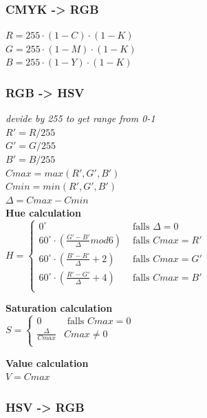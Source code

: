 \subsubsection{CMYK -> RGB}

$R = 255 \cdot (1-C) \cdot (1-K)$\\
$G = 255 \cdot (1-M) \cdot (1-K)$\\
$B = 255 \cdot (1-Y) \cdot (1-K)$\\

\subsubsection{RGB -> HSV}
\textit{devide by 255 to get range from 0-1}\\
$R' = R / 255$\\
$G' = G / 255$\\
$B' = B / 255$\\

$Cmax = max(R',G',B')$\\
$Cmin = min(R',G',B')$\\
$\Delta = Cmax - Cmin$\\

\textbf{Hue calculation}\\

$H = \begin{cases}
	0^\circ     & \text{ falls } \Delta = 0 \\
	60^\circ \cdot (\frac{G'-B'}{\Delta}mod 6) & \text{ falls } Cmax = R' \\
	60^\circ \cdot (\frac{B'-R'}{\Delta}+2) & \text{ falls } Cmax = G' \\
	60^\circ \cdot (\frac{R'-G'}{\Delta}+4) & \text{ falls } Cmax = B' \\
\end{cases}$

\textbf{Saturation calculation}\\

$S = \begin{cases}
	0     & \text{ falls } Cmax = 0 \\
	\frac{\Delta}{Cmax} & Cmax \neq 0 \\
\end{cases}$

\textbf{Value calculation}\\
$V = Cmax$

\subsubsection{HSV -> RGB}

